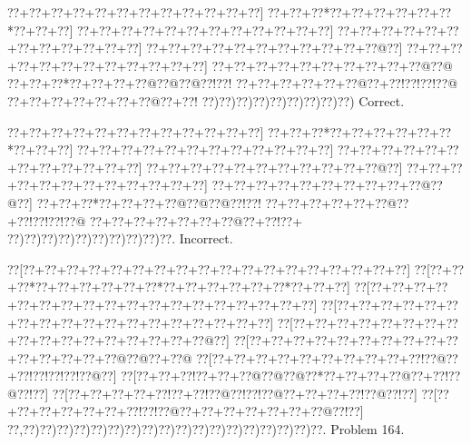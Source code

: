 \documentclass[a5paper]{article}
\begin{document}
\begin{center}
{\goo
\0??+\0??+\0??+\0??+\0??+\0??+\0??+\0??+\0??+\0??+\0??+\0??]
\0??+\0??+\0??*\0??+\0??+\0??+\0??+\0??+\0??*\0??+\0??+\0??]
\0??+\0??+\0??+\0??+\0??+\0??+\0??+\0??+\0??+\0??+\0??+\0??]
\0??+\0??+\0??+\0??+\0??+\0??+\0??+\0??+\0??+\0??+\0??+\0??]
\0??+\0??+\0??+\0??+\0??+\0??+\0??+\0??+\0??+\0??+\0??@\0??]
\0??+\0??+\0??+\0??+\0??+\0??+\0??+\0??+\0??+\0??+\0??+\0??]
\0??+\0??+\0??+\0??+\0??+\0??+\0??+\0??+\0??+\0??@\0??@
\0??+\0??+\0??*\0??+\0??+\0??+\0??@\0??@\0??@\0??!\0??!
\0??+\0??+\0??+\0??+\0??+\0??@\0??+\0??!\0??!\0??!\0??@
\0??+\0??+\0??+\0??+\0??+\0??+\0??@\0??+\0??!
\0??)\0??)\0??)\0??)\0??)\0??)\0??)\0??)\0??)
}
Correct. 

\end{center}
\begin{center}
{\goo
\0??+\0??+\0??+\0??+\0??+\0??+\0??+\0??+\0??+\0??+\0??+\0??]
\0??+\0??+\0??*\0??+\0??+\0??+\0??+\0??+\0??*\0??+\0??+\0??]
\0??+\0??+\0??+\0??+\0??+\0??+\0??+\0??+\0??+\0??+\0??+\0??]
\0??+\0??+\0??+\0??+\0??+\0??+\0??+\0??+\0??+\0??+\0??+\0??]
\0??+\0??+\0??+\0??+\0??+\0??+\0??+\0??+\0??+\0??+\0??@\0??]
\0??+\0??+\0??+\0??+\0??+\0??+\0??+\0??+\0??+\0??+\0??+\0??]
\0??+\0??+\0??+\0??+\0??+\0??+\0??+\0??+\0??+\0??@\0??@\0??]
\0??+\0??+\0??*\0??+\0??+\0??+\0??@\0??@\0??@\0??!\0??!
\0??+\0??+\0??+\0??+\0??+\0??@\0??+\0??!\0??!\0??!\0??@
\0??+\0??+\0??+\0??+\0??+\0??+\0??@\0??+\0??!\0??+
\0??)\0??)\0??)\0??)\0??)\0??)\0??)\0??)\0??)\0??.
}
Incorrect. 

\end{center}
\newpage
\begin{center}
{\goo
\0??[\0??+\0??+\0??+\0??+\0??+\0??+\0??+\0??+\0??+\0??+\0??+\0??+\0??+\0??+\0??+\0??+\0??+\0??]
\0??[\0??+\0??+\0??*\0??+\0??+\0??+\0??+\0??+\0??*\0??+\0??+\0??+\0??+\0??+\0??*\0??+\0??+\0??]
\0??[\0??+\0??+\0??+\0??+\0??+\0??+\0??+\0??+\0??+\0??+\0??+\0??+\0??+\0??+\0??+\0??+\0??+\0??]
\0??[\0??+\0??+\0??+\0??+\0??+\0??+\0??+\0??+\0??+\0??+\0??+\0??+\0??+\0??+\0??+\0??+\0??+\0??]
\0??[\0??+\0??+\0??+\0??+\0??+\0??+\0??+\0??+\0??+\0??+\0??+\0??+\0??+\0??+\0??+\0??+\0??@\0??]
\0??[\0??+\0??+\0??+\0??+\0??+\0??+\0??+\0??+\0??+\0??+\0??+\0??+\0??+\0??+\0??@\0??@\0??+\0??@
\0??[\0??+\0??+\0??+\0??+\0??+\0??+\0??+\0??+\0??+\0??!\0??@\0??+\0??!\0??!\0??!\0??!\0??@\0??]
\0??[\0??+\0??+\0??!\0??+\0??+\0??@\0??@\0??@\0??*\0??+\0??+\0??+\0??@\0??+\0??!\0??@\0??!\0??]
\0??[\0??+\0??+\0??+\0??+\0??!\0??+\0??!\0??@\0??!\0??!\0??@\0??+\0??+\0??+\0??!\0??@\0??!\0??]
\0??[\0??+\0??+\0??+\0??+\0??+\0??+\0??!\0??!\0??@\0??+\0??+\0??+\0??+\0??+\0??+\0??@\0??!\0??]
\0??,\0??)\0??)\0??)\0??)\0??)\0??)\0??)\0??)\0??)\0??)\0??)\0??)\0??)\0??)\0??)\0??)\0??)\0??.
}
Problem 164.

\end{center}
\end{document}
